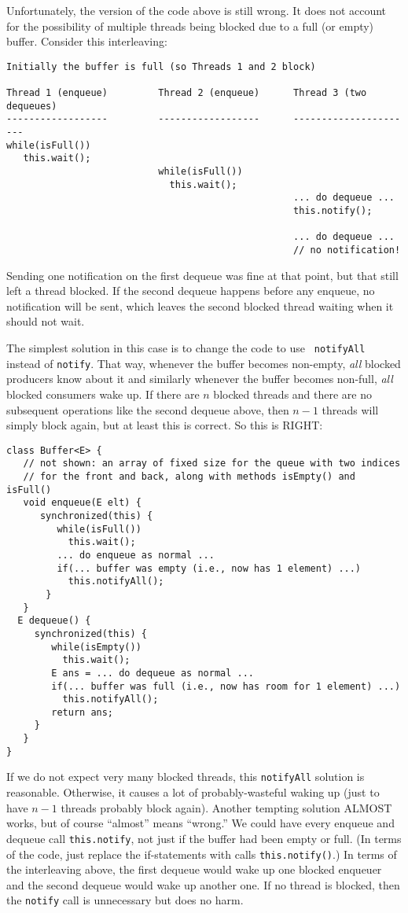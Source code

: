 \documentclass[10pt]{article}
\begin{document}
Unfortunately, the version of the code above is still wrong.  It does
not account for the possibility of multiple threads being blocked due
to a full (or empty) buffer.  Consider this interleaving:
\begin{verbatim}
Initially the buffer is full (so Threads 1 and 2 block)

Thread 1 (enqueue)         Thread 2 (enqueue)      Thread 3 (two dequeues)
------------------         ------------------      ----------------------
while(isFull())
   this.wait();
                           while(isFull())
                             this.wait();
                                                   ... do dequeue ...
                                                   this.notify();

                                                   ... do dequeue ...
                                                   // no notification!
\end{verbatim}
Sending one notification on the first dequeue was fine at that point,
but that still left a thread blocked.  If the second dequeue happens
before any enqueue, no notification will be sent, which leaves the
second blocked thread waiting when it should not wait.  

The simplest solution in this case is to change the code to use {\tt
  notifyAll} instead of {\tt notify}.  That way, whenever the buffer
  becomes non-empty, \emph{all} blocked producers know about it and
  similarly whenever the buffer becomes non-full, \emph{all} blocked
  consumers wake up.  If there are $n$ blocked threads and there are
  no subsequent operations like the second dequeue above, then $n-1$
  threads will simply block again, but at least this is correct.  So
  this is RIGHT:
\begin{verbatim}
class Buffer<E> {
   // not shown: an array of fixed size for the queue with two indices
   // for the front and back, along with methods isEmpty() and isFull()
   void enqueue(E elt) {
      synchronized(this) {
         while(isFull())
           this.wait();    
         ... do enqueue as normal ...
         if(... buffer was empty (i.e., now has 1 element) ...)
           this.notifyAll();
       }
   }
  E dequeue() {
     synchronized(this) {
        while(isEmpty())
          this.wait();
        E ans = ... do dequeue as normal ...
        if(... buffer was full (i.e., now has room for 1 element) ...)
          this.notifyAll();
        return ans;
     }
   }
}
\end{verbatim}
If we do not expect very many blocked threads, this {\tt notifyAll}
solution is reasonable.  Otherwise, it causes a lot of
probably-wasteful waking up (just to have $n-1$ threads probably block
again).  Another tempting solution ALMOST works, but of course
``almost'' means ``wrong.''  We could have every enqueue and dequeue
call {\tt this.notify}, not just if the buffer had been empty or
full.  (In terms of the code, just replace the if-statements with
calls {\tt this.notify()}.)  In terms of the interleaving above, the
first dequeue would wake up one blocked enqueuer and the second
dequeue would wake up another one.  If no thread is blocked, then the
{\tt notify} call is unnecessary but does no harm.
\end{document}
